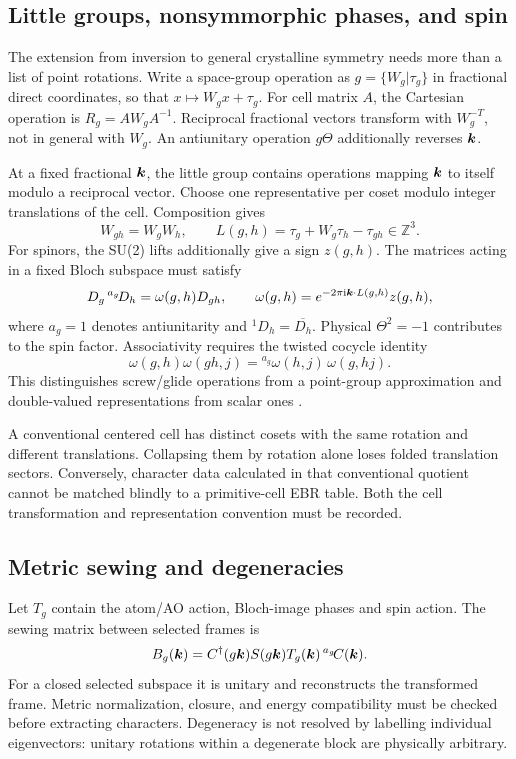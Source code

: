 \subsection{Little groups, nonsymmorphic phases, and spin}
The extension from inversion to general crystalline symmetry needs more
than a list of point rotations. Write a space-group operation as
$g=\{W_g|\tau_g\}$ in fractional direct coordinates, so that
$x\mapsto W_gx+\tau_g$. For cell matrix $A$, the Cartesian operation is
$R_g=AW_gA^{-1}$. Reciprocal fractional vectors transform with
$W_g^{-T}$, not in general with $W_g$. An antiunitary operation
$g\Theta$ additionally reverses $\bm{k}$.

At a fixed fractional $\bm{k}$, the little group contains operations
mapping $\bm{k}$ to itself modulo a reciprocal vector. Choose one
representative per coset modulo integer translations of the cell.
Composition gives
\begin{equation}
 W_{gh}=W_gW_h,\qquad
 L(g,h)=\tau_g+W_g\tau_h-\tau_{gh}\in\mathbb Z^3 .
 \label{eq:coset-products}
\end{equation}
For spinors, the SU(2) lifts additionally give a sign $z(g,h)$.
The matrices acting in a fixed Bloch subspace must satisfy
\begin{equation}
 D_g\,{}^{a_g}\!D_h=\omega(g,h)D_{gh},\qquad
 \omega(g,h)=e^{-2\pi\mathrm{i}\bm{k}\cdot L(g,h)}z(g,h),
 \label{eq:projective-group}
\end{equation}
where $a_g=1$ denotes antiunitarity and
\({}^{1}\!D_h=\overline{D_h}\).
Physical $\Theta^2=-1$ contributes to the spin factor.
Associativity requires the twisted cocycle identity
\begin{equation}
 \omega(g,h)\omega(gh,j)
 ={}^{a_g}\!\omega(h,j)\,\omega(g,hj).
 \label{eq:cocycle}
\end{equation}
This distinguishes screw/glide operations from a point-group
approximation and double-valued representations from scalar ones
\cite{SpglibDefinitions,SpgrepFormulation}.

A conventional centered cell has distinct cosets with the same rotation
and different translations. Collapsing them by rotation alone loses
folded translation sectors. Conversely, character data calculated in
that conventional quotient cannot be matched blindly to a primitive-cell
EBR table. Both the cell transformation and representation convention
must be recorded.

\subsection{Metric sewing and degeneracies}
Let $T_g$ contain the atom/AO action, Bloch-image phases and spin action.
The sewing matrix between selected frames is
\begin{equation}
 B_g(\bm{k})=C^\dagger(g\bm{k})S(g\bm{k})
 T_g(\bm{k})\,{}^{a_g}\!C(\bm{k}).
 \label{eq:sewing}
\end{equation}
For a closed selected subspace it is unitary and reconstructs the
transformed frame. Metric normalization, closure, and energy
compatibility must be checked before extracting characters.
Degeneracy is not resolved by labelling individual eigenvectors:
unitary rotations within a degenerate block are physically arbitrary.

